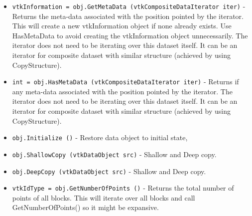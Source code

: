 \begin{itemize}
\item  \verb|vtkInformation = obj.GetMetaData (vtkCompositeDataIterator iter)| -  Returns the meta-data associated with the position pointed by the iterator.
 This will create a new vtkInformation object if none already exists. Use
 HasMetaData to avoid creating the vtkInformation object unnecessarily.
 The iterator does not need to be iterating over this dataset itself. It can
 be an iterator for composite dataset with similar structure (achieved by
 using CopyStructure).

\item  \verb|int = obj.HasMetaData (vtkCompositeDataIterator iter)| -  Returns if any meta-data associated with the position pointed by the iterator.
 The iterator does not need to be iterating over this dataset itself. It can
 be an iterator for composite dataset with similar structure (achieved by
 using CopyStructure).

\item  \verb|obj.Initialize ()| -  Restore data object to initial state,

\item  \verb|obj.ShallowCopy (vtkDataObject src)| -  Shallow and Deep copy.

\item  \verb|obj.DeepCopy (vtkDataObject src)| -  Shallow and Deep copy.

\item  \verb|vtkIdType = obj.GetNumberOfPoints ()| -  Returns the total number of points of all blocks. This will
 iterate over all blocks and call GetNumberOfPoints() so it
 might be expansive.

\end{itemize}
